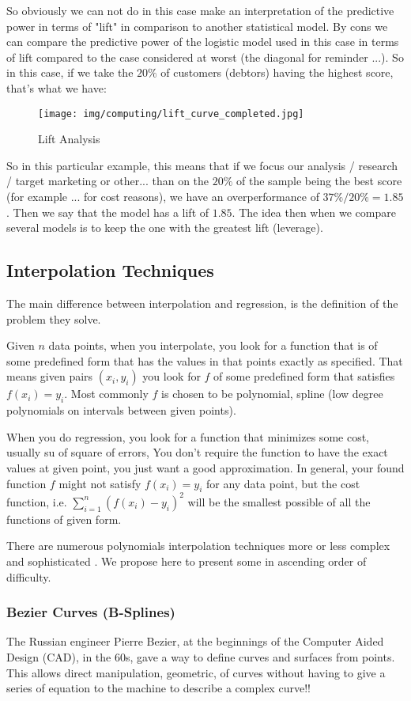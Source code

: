	So obviously we can not do in this case make an interpretation of the predictive power in terms of "lift" in comparison to another statistical model. By cons we can compare the predictive power of the logistic model used in this case in terms of lift compared to the case considered at worst (the diagonal for reminder ...). So in this case, if we take the $20\%$ of customers (debtors) having the highest score, that's what we have:
	\begin{figure}[H]
		\centering
		\texttt{[image: img/computing/lift\_curve\_completed.jpg]}
		\caption[]{Lift Analysis}
	\end{figure}
	So in this particular example, this means that if we focus our analysis / research / target marketing or other... than on the $20\%$ of the sample being the best score (for example ... for cost reasons), we have an overperformance of $37\% / 20\% = 1.85$. Then we say that the model has a lift of $1.85$. The idea then when we compare several models is to keep the one with the greatest lift (leverage).
	
	\pagebreak
	\subsection{Interpolation Techniques}
	The main difference between interpolation and regression, is the definition of the problem they solve.

	Given $n$ data points, when you interpolate, you look for a function that is of some predefined form that has the values in that points exactly as specified. That means given pairs $(x_i,y_i)$ you look for $f$ of some predefined form that satisfies $f(x_i)=y_i$. Most commonly $f$ is chosen to be polynomial, spline (low degree polynomials on intervals between given points).
	
	When you do regression, you look for a function that minimizes some cost, usually su of square of errors, You don't require the function to have the exact values at given point, you just want a good approximation. In general, your found function $f$ might not satisfy $f(x_i)=y_i$ for any data point, but the cost function, i.e. $\displaystyle\sum_{i=1}^n(f(x_i)-y_i)^2$ will be the smallest possible of all the functions of given form.
	
	There are numerous polynomials interpolation techniques more or less complex and sophisticated . We propose here to present some in ascending order of difficulty.
	
	\subsubsection{Bezier Curves (B-Splines)}
	The Russian engineer Pierre Bezier, at the beginnings of the Computer Aided Design (CAD), in the 60s, gave a way to define curves and surfaces from points. This allows direct manipulation, geometric, of curves without having to give a series of equation to the machine to describe a complex curve!!
	
